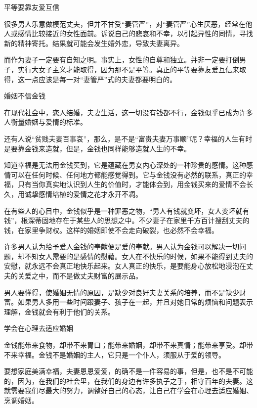 \documentclass[12pt,UTF8]{ctexbook}
\begin{document}
平等要靠友爱互信


很多男人乐意做模范丈夫，但并不甘受“妻管严”，对“妻管严”心生厌恶，经常在他人或感情比较接近的女性面前。诉说自己的悲哀和不幸，以引起异性的同情，寻找新的精神寄托。结果就可能会发生婚外恋，导致夫妻离异。

而作为妻子一定要有自知之明。事实上，女性的自尊和独立。并非一定要打倒男子，实行大女子主义才能取得，因为那不是平等。真正的平等要靠友爱互信来取得，这一点应该是每一对“妻管严”式的夫妻都要明白的。





婚姻不信金钱


在现代社会中，恋人结婚，夫妻生活，这一切没有钱都不行，金钱似乎已成为许多人衡量婚姻与爱情的标准。

还有人说“贫贱夫妻百事哀”，那么，是不是“富贵夫妻万事顺”呢？幸福的人生有时是要靠金钱来造就，但是，金钱也同样能够造就人生的不幸。

知道幸福是无法用金钱买到，它是蕴藏在男女内心深处的一种珍贵的感情。这种感情可以在任何时候、任何地方都能感觉得到。它与金钱没有必然的联系，真正的幸福，只有当你真实地认识到人生的价值时，才能体会到，用金钱买来的爱情不会长久，用诚挚感情培植的爱情之花才永开不凋。

在有些人的心目中，金钱似乎是一种罪恶之物，“男人有钱就变坏，女人变坏就有钱”，根深蒂固地存在于某些人的思想之中。不少妻子在家里千方百计搜刮丈夫的钱，在家里争财权。这样的婚姻即使不会走向破裂，也必然不会幸福。

许多男人认为给予爱人金钱的奉献便是爱的奉献。男人认为金钱可以解决一切问题，却不知女人需要的是感情的慰藉。女人在不快乐的时候，如果不能得到丈夫的安慰，就永远不会真正地快乐起来。女人真正的快乐，是要能身心放松地浸泡在丈夫的关爱之中，而不是做丈夫财富的展示品。

男人要懂得，使婚姻无情的原因，是缺少对良好夫妻关系的培养，而不是缺少财富。如果男人多用一些时间跟妻子、孩子在一起，并且对她日常的烦恼和问题表示理解，金钱就会有利于他们的关系。





学会在心理去适应婚姻


金钱能带来食物，却带不来胃口；能带来婚姻，却带不来真情；能带来享受。却带不来幸福。金钱不是婚姻的主人，它只是一个仆人，须服从于爱的领导。

要想家庭美满幸福，夫妻恩恩爱爱，的确不是一件容易的事，但是，也不是不可能的，因为，在我们的社会里，在我们的身边有许多执子之手，相守百年的夫妻。这就需要我们尽最大的努力，调整好自己的心态，让自己在学会在心理去适应婚姻、烹调婚姻。
\end{document}
